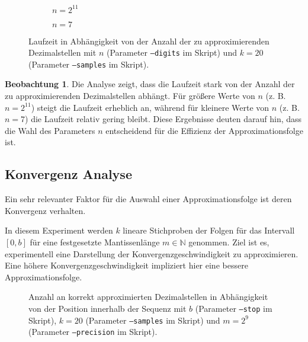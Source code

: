 \documentclass{scrartcl}
\theoremstyle{definition}
\newtheorem{approximation sequence}{Annäherungsfolge}
\newtheorem{observation}{Beobachtung}
\begin{document}
\begin{figure}[H]
    \centering
    \begin{subfigure}{\textwidth}
        \centering
        
        \caption{\(n = 2^{11}\)}
    \end{subfigure}
    \hfill
    \begin{subfigure}{\textwidth}
        \centering
        
        \caption{\(n = 7\)}
    \end{subfigure}
    \caption{%
        Laufzeit in Abhängigkeit von der Anzahl der zu approximierenden
        Dezimalstellen mit \(n\) (Parameter \texttt{--digits} im Skript)
        und \(k = 20\) (Parameter \texttt{--samples} im Skript).
    }
\end{figure}

\begin{observation}
    Die Analyse zeigt, dass die Laufzeit stark von der Anzahl der zu
    approximierenden Dezimalstellen abhängt. Für größere Werte von \(n\) (z. B.
    \(n = 2^{11}\)) steigt die Laufzeit erheblich an, während für kleinere
    Werte von \(n\) (z. B. \(n = 7\)) die Laufzeit relativ gering bleibt. Diese
    Ergebnisse deuten darauf hin, dass die Wahl des Parameters \(n\)
    entscheidend für die Effizienz der Approximationsfolge ist.
\end{observation}

\subsection{Konvergenz Analyse}\label{sec:convergence-analysis}

Ein sehr relevanter Faktor für die Auswahl einer Approximationsfolge ist deren
Konvergenz verhalten.

In diesem Experiment werden \(k\) lineare Stichproben der Folgen für das
Intervall \([0, b]\) für eine festgesetzte Mantissenlänge \(m \in \mathbb{N}\)
genommen. Ziel ist es, experimentell eine Darstellung der
Konvergenzgeschwindigkeit zu approximieren. Eine höhere
Konvergenzgeschwindigkeit impliziert hier eine bessere Approximationsfolge.

\begin{figure}[H]
    \centering
    \subfloat[\centering \(b = 10^2\)]{%
        
    }
    \subfloat[\centering \(b = 10^6\)]{%
        
    }
    \caption{%
        Anzahl an korrekt approximierten Dezimalstellen in Abhängigkeit von der
        Position innerhalb der Sequenz mit \(b\) (Parameter \texttt{--stop} im
        Skript), \(k = 20\) (Parameter \texttt{--samples} im Skript) und \(m =
        2^9\) (Parameter \texttt{--precision} im Skript). }
    \label{fig:convergence-analysis}
\end{figure}
\end{document}
